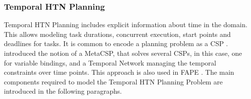 

\subsubsection{Temporal HTN Planning}\label{sec:temporal-htn-planning}

Temporal HTN Planning includes explicit information about time in the domain.
This allows modeling task durations, concurrent execution, start points and deadlines for tasks.
It is common to encode a planning problem as a CSP \citep[chap.~8]{ghallabAutomatedPlanningTheory2004}.
\cite{stockHierarchicalHybridPlanning2015} introduced the notion of a MetaCSP, that solves several CSPs, in this case, one for variable bindings, and a Temporal Network managing the temporal constraints over time points.
This approach is also used in FAPE \citep{bit-monnotTemporalHierarchicalModels2016a}.
The main components required to model the Temporal HTN Planning Problem are introduced in the following paragraphs. 


